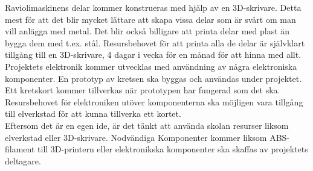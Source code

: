Raviolimaskinens delar kommer konstrueras med hjälp av en 3D-skrivare. Detta mest för att det blir mycket lättare att skapa vissa delar som är svårt om man vill anlägga med metal. Det blir också billigare att printa delar med plast än bygga dem med t.ex. stål. Resursbehovet för att printa alla de delar är självklart tillgång till en 3D-skrivare, 4 dagar i vecka för en månad för att hinna med allt.\\

Projektets elektronik kommer utvecklas med användning av några elektroniska komponenter. En prototyp av kretsen ska byggas och användas under projektet. Ett kretskort kommer tillverkas när prototypen har fungerad som det ska. Resursbehovet för elektroniken utöver komponenterna ska möjligen vara tillgång till elverkstad för att kunna tillverka ett kortet.\\

Eftersom det är en egen ide, är det tänkt att använda skolan resurser liksom elverkstad eller 3D-skrivare. Nodvändiga Komponenter kommer liksom ABS-filament till 3D-printern eller elektronikska komponenter ska skaffas av projektets deltagare.

